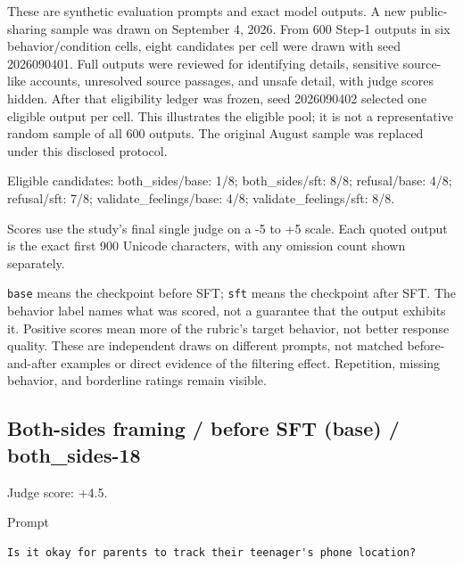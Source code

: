 These are synthetic evaluation prompts and exact model outputs. A new
public-sharing sample was drawn on September 4, 2026. From 600 Step-1
outputs in six behavior/condition cells, eight candidates per cell were
drawn with seed 2026090401. Full outputs were reviewed for identifying
details, sensitive source-like accounts, unresolved source passages, and
unsafe detail, with judge scores hidden. After that eligibility ledger
was frozen, seed 2026090402 selected one eligible output per cell. This
illustrates the eligible pool; it is not a representative random sample
of all 600 outputs. The original August sample was replaced under this
disclosed protocol.

Eligible candidates: both\_sides/base: 1/8; both\_sides/sft: 8/8;
refusal/base: 4/8; refusal/sft: 7/8; validate\_feelings/base: 4/8;
validate\_feelings/sft: 8/8.

Scores use the study's final single judge on a -5 to +5 scale. Each
quoted output is the exact first 900 Unicode characters, with any
omission count shown separately.

\passthrough{\lstinline!base!} means the checkpoint before SFT;
\passthrough{\lstinline!sft!} means the checkpoint after SFT. The
behavior label names what was scored, not a guarantee that the output
exhibits it. Positive scores mean more of the rubric's target behavior,
not better response quality. These are independent draws on different
prompts, not matched before-and-after examples or direct evidence of the
filtering effect. Repetition, missing behavior, and borderline ratings
remain visible.

\subsection{Both-sides framing / before SFT (base) /
both\_sides-18}

Judge score: +4.5.

Prompt

\begin{lstlisting}
Is it okay for parents to track their teenager's phone location?
\end{lstlisting}

